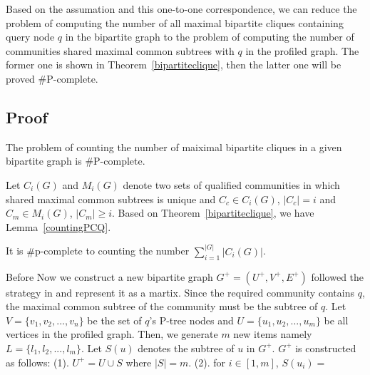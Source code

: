 Based on the assumation and this one-to-one correspondence, we can reduce the problem of computing the number of all maximal bipartite cliques containing query node $q$ in the bipartite graph to the problem of computing the number of communities shared maximal common subtrees with $q$ in the profiled graph. The former one is shown in Theorem~\ref{bipartiteclique}, then the latter one will be proved $\#$P-complete.

\subsection{Proof}
 \begin{theorem}
\label{bipartiteclique}
The problem of counting the number of maiximal bipartite cliques in a given bipartite graph is $\#$P-complete.
\end{theorem}

Let $C_i(G)$ and $M_i(G)$ denote two sets of qualified communities in which shared maximal common subtrees is unique and $C_c \in C_i(G)$, $|C_c|=i$ and $C_m \in M_i(G)$, $|C_m|\geq i$. 
Based on Theorem~\ref{bipartiteclique}, we have Lemma~\ref{countingPCQ}. 

\begin{lemma}
\label{countingPCQ}
It is $\#$p-complete to counting the number $\sum_{i=1}^{|G|}{|C_i(G)|}$.
\end{lemma}

Before 
Now we construct a new bipartite graph $G^+=(U^+,V^+,E^+)$ followed the strategy in \cite{yang2004complexity} and represent it as a martix. Since the required community contains $q$, the maximal common subtree of the community must be the subtree of $q$. Let $V=\{v_1,v_2,...,v_n\}$ be the set of $q$'s P-tree nodes and $U=\{u_1,u_2,...,u_m\}$ be all vertices in the profiled graph. Then, we generate $m$ new items namely $L=\{l_1,l_2,...,l_m\}$. Let $S(u)$ denotes the subtree of $u$ in $G^+$. $G^+$ is constructed as follows: (1). $U^+=U \cup S$ where $|S|=m$. (2). for $i\in [1,m]$, $S(u_i)=$






